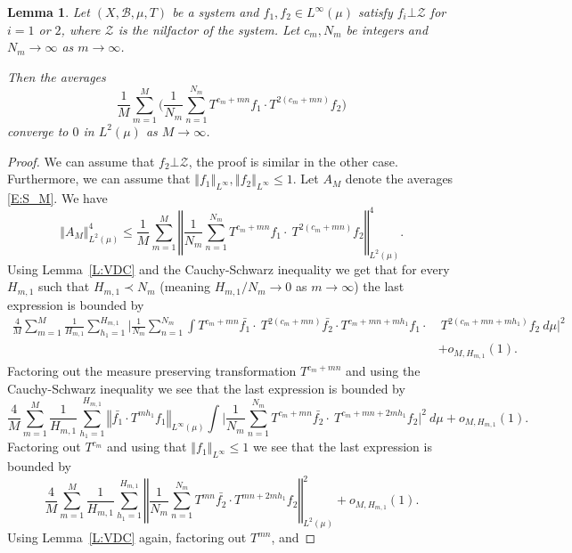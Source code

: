 \documentclass[11pt]{amsart}
\newcommand{\cZ}{\mathcal{Z}}
\newcommand{\norm}[1]{\left\Vert #1\right\Vert}
\theoremstyle{plain}
\newtheorem{lemma}[theorem]{Lemma}
\theoremstyle{definition}
\theoremstyle{remark}
\begin{document}
\begin{lemma}\label{L:seminorm} Let $(X,\mathcal{B},\mu,T)$ be a system and
  $f_1,f_2\in L^\infty(\mu)$
  satisfy $f_i\bot \mathcal{Z}$ for $i=1$ or $2$, where $\cZ$ is the nilfactor of the system.
Let $c_m,N_m$ be integers and $N_m\to \infty$ as $m\to\infty$.

   Then the averages
  \begin{equation}\label{E:S_M}
    \frac{1}{M}\sum_{m=1}^M\Big(\frac{1}{N_m}\sum_{n=1}^{N_m}   T^{c_m+mn}f_1
    \cdot T^{2(c_m+mn)}f_2\Big)
  \end{equation}
  converge to $0$ in $L^2(\mu)$ as $M\to \infty$.
\end{lemma}
\begin{proof}
  We can assume that $f_2\bot \mathcal{Z}$, the proof is similar in
  the other case. Furthermore, we can assume that $\norm{f_1}_{L^\infty}, \norm{f_2}_{L^\infty}\leq 1$.
    Let $A_M$ denote the averages \eqref{E:S_M}.  We
  have
$$
\norm{A_M}_{L^2(\mu)}^4 \leq \frac{1}{M}\sum_{m=1}^{M}\norm{
  \frac{1}{N_m}\sum_{n=1}^{N_m} T^{c_m+mn}f_1 \cdot\
  T^{2(c_m+mn)}f_2}_{L^2(\mu)}^4.
$$
Using Lemma~\ref{L:VDC} and the Cauchy-Schwarz inequality we get that
for every $H_{m,1}$ such that $H_{m,1}\prec N_m$ (meaning
$H_{m,1}/N_m\to 0$ as $m\to\infty$) the last expression is bounded by
\begin{align*}
  \frac{4}{M}\sum_{m=1}^{M}\frac{1}{H_{m,1}}\sum_{h_1=1}^{H_{m,1}}\Big|
  \frac{1}{N_m}\sum_{n=1}^{N_m}\int T^{c_m+mn}\bar{f_1} \cdot\
  T^{2(c_m+mn)}\bar{f_2}\cdot T^{c_m+mn+mh_1} f_1 \cdot &\
  T^{2(c_m+mn+mh_1)}f_2\ d\mu\Big|^2\\ &+o_{M,H_{m,1}}{(1)}.
\end{align*}
Factoring out the measure preserving transformation $T^{c_m+mn}$ and
using the Cauchy-Schwarz inequality we see that the last expression is bounded by
$$
  \frac{4}{M}\sum_{m=1}^{M}\frac{1}{H_{m,1}}\sum_{h_1=1}^{H_{m,1}}
  \norm{\bar{f_1}\cdot T^{mh_1} f_1}_{L^\infty(\mu)}\int  \Big|\frac{1}{N_m}
  \sum_{n=1}^{N_m}
  T^{c_m+mn}\bar{f_2} \cdot \
  T^{c_m+mn+2mh_1}f_2\Big|^2 \ d\mu+o_{M,H_{m,1}}{(1)}.
$$
Factoring out $T^{c_m}$ and using that $\norm{f_1}_{L^\infty}\leq 1$ we see that
the last expression is bounded by
$$
\frac{4}{M}\sum_{m=1}^{M}\frac{1}{H_{m,1}}\sum_{h_1=1}^{H_{m,1}}\norm{
  \frac{1}{N_m}\sum_{n=1}^{N_m} T^{mn}\bar{f_2}\cdot
  T^{mn+2mh_1}f_2}_{L^2(\mu)}^2+ o_{M,H_{m,1}}{(1)}.
$$
Using Lemma~\ref{L:VDC} again, factoring out $T^{mn}$, and

\end{proof}
\end{document}

